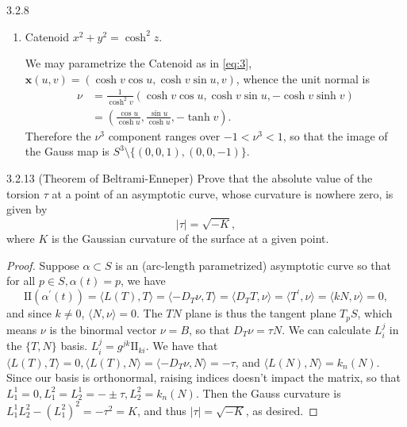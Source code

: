 \documentclass[11pt]{article}
\begin{document}
\begin{problem}{3.2.8}
\begin{enumerate}[label=(\alph*)]
\begin{answer}
      Therefore, the image of the Gauss map is the open band on the \( S^3 \) with polar angle \( \frac{\pi}{4} < \theta < \frac{3\pi}{4} \).
          \end{answer}
    \item Catenoid \( x^2 + y^2 = \cosh^2 z \).
          \begin{answer}
            We may parametrize the Catenoid as in \cref{eq:3}, \( \mathbf{x}(u,v) = (\cosh v\cos u, \cosh v \sin u, v) \), whence the unit normal is
            \begin{equation}
            \label{eq:17}
            \begin{aligned}
              \nu &= \frac{1}{\cosh^2 v} \left( \cosh v \cos u, \cosh v \sin u, -\cosh v \sinh v \right) \\
              &= \left( \frac{\cos u}{\cosh u}, \frac{\sin u}{\cosh u}, -\tanh v \right).
            \end{aligned}
          \end{equation}
          Therefore the \(\nu^3\) component ranges over \( -1 < \nu^3 < 1 \), so that the image of the Gauss map is \( S^3 \setminus \{(0,0,1), (0,0,-1)\} \).
          \end{answer}
  \end{enumerate}
\end{problem}

\begin{problem}{3.2.13 (Theorem of Beltrami-Enneper)}
  Prove that the absolute value of the torsion \(\tau\) at a point of an asymptotic curve, whose curvature is nowhere zero, is given by
  \begin{equation}
  \label{eq:2}
  | \tau | = \sqrt{- K},
\end{equation}
where \( K \) is the Gaussian curvature of the surface at a given point.
\end{problem}
\begin{proof}
  Suppose \(\alpha \subset S \) is an (arc-length parametrized) asymptotic curve so that for all \( p \in S, \alpha(t) = p \), we have
  \begin{equation}
 \mathrm{I\!I}(\alpha^{\prime}(t)) = \langle L(T), T \rangle = \langle -D_T\nu, T \rangle = \langle D_T T, \nu \rangle = \langle T^{\prime}, \nu \rangle = \langle kN, \nu \rangle = 0,
\end{equation}
and since \( k \neq 0 \), \( \langle N, \nu \rangle = 0 \).
The \( TN \) plane is thus the tangent plane \( T_pS \), which means \(\nu\) is the binormal vector \( \nu = B \), so that \(D_{T}\nu = \tau N \).
We can calculate \( L_i^j \) in the \( \{T,N\} \) basis.
\( L_i^j = g^{jk}\mathrm{I\!I}_{ki} \).
We have that \( \langle L(T), T \rangle = 0, \langle L(T), N \rangle = \langle -D_T\nu, N \rangle = -\tau \), and \( \langle L(N), N \rangle = k_n(N) \).
Since our basis is orthonormal, raising indices doesn't impact the matrix, so that \( L_1^1 = 0, L_1^2 = L_2^1 = -\pm \tau, L_2^2 = k_n(N) \).
Then the Gauss curvature is \( L_1^1L_2^2 - (L_1^2)^2 = -\tau^2 = K \), and thus \( | \tau | = \sqrt{- K} \), as desired.
\end{proof}
\end{document}
